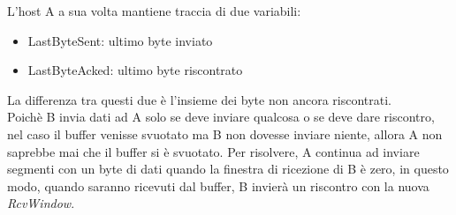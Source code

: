 \documentclass[11pt,a4paper]{article}
\begin{document}
L'host A a sua volta mantiene traccia di due variabili:
\begin{itemize}
	\item LastByteSent: ultimo byte inviato
	\item LastByteAcked: ultimo byte riscontrato
\end{itemize}
La differenza tra questi due è l'insieme dei byte non ancora riscontrati. \\
Poichè B invia dati ad A solo se deve inviare qualcosa o se deve dare riscontro, nel caso il buffer venisse svuotato ma B non dovesse inviare niente, allora A non saprebbe mai che il buffer si è svuotato. Per risolvere, A continua ad inviare segmenti con un byte di dati quando la finestra di ricezione di B è zero, in questo modo, quando saranno ricevuti dal buffer, B invierà un riscontro con la nuova \emph{RcvWindow}.
\end{document}
